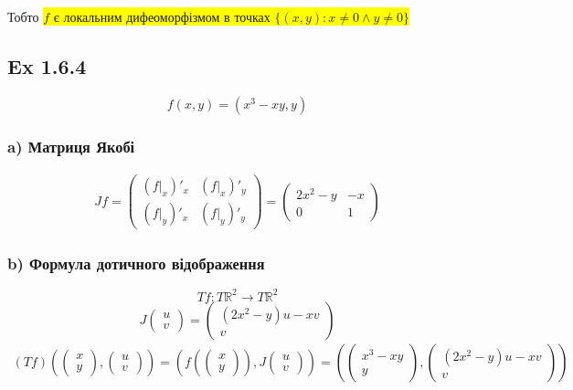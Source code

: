 \documentclass[10pt, a4paper]{article} %
\newcommand{\R}{\mathbb{R}}
\begin{document}
Тобто \colorbox{yellow}{$f$ є локальним дифеоморфізмом в точках $\{(x,y) : x\ne 0 \land y \ne 0\}$}

\subsection*{Ex 1.6.4}
\[f(x,y) = (x^3-xy, y)\]
\subsubsection*{a) Матриця Якобі}
\begin{align*}
    Jf = \begin{pmatrix}
        (f|_x)'_x & (f|_x)'_y\\
        (f|_y)'_x & (f|_y)'_y
    \end{pmatrix} 
    = \begin{pmatrix}
        2x^2-y & -x\\
        0 & 1
    \end{pmatrix}
\end{align*}

\subsubsection*{b) Формула дотичного відображення}
\[Tf : T\R^2 \to T\R^2\]
\[J\begin{pmatrix}u\\v\end{pmatrix} = \begin{pmatrix}(2x^2-y)u-xv\\v\end{pmatrix}\]
\begin{align*}
    (Tf)\left(\begin{pmatrix}x\\y\end{pmatrix} , \begin{pmatrix}u\\v\end{pmatrix}\right)
    = \left(f(\begin{pmatrix}x\\y\end{pmatrix}) , J\begin{pmatrix}u\\v\end{pmatrix}\right)
    = \left(\begin{pmatrix}x^3-xy \\ y\end{pmatrix} , \begin{pmatrix}(2x^2-y)u-xv\\v\end{pmatrix}\right)
\end{align*}
\end{document}
